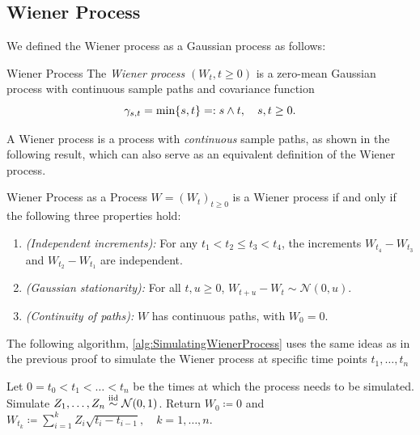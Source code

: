 \subsection{Wiener Process}

We defined the Wiener process as a Gaussian process as follows:
\begin{defn}{Wiener Process}{}
	The \textit{Wiener process} $(W_t, t \geq 0)$ is a zero-mean Gaussian process with continuous sample paths and covariance function
	\begin{equation}
		\gamma_{s,t} = \min\{s, t\} =: s \wedge t, \quad s, t \geq 0. \notag
		\label{eq:WienerProcessCovarianceFunction}
	\end{equation}
\end{defn}

A Wiener process is a \Levy \; process with \textit{continuous} sample paths, as shown in the following result, which can also serve as an equivalent definition of the Wiener process.

\begin{thm}{Wiener Process as a \Levy \; Process}{}
	$W = (W_t)_{t \geq 0}$ is a Wiener process if and only if the following three properties hold:
	\begin{enumerate}
		\item \textit{(Independent increments):} For any $t_1 < t_2 \leq t_3 < t_4$, the increments $W_{t_4} - W_{t_3}$ and $W_{t_2} - W_{t_1}$ are independent.
		\item \textit{(Gaussian stationarity):} For all $t, u \geq 0$, $W_{t+u} - W_t \sim \mathcal{N}(0, u)$.
		\item \textit{(Continuity of paths):} $W$ has continuous paths, with $W_0 = 0$.
	\end{enumerate}
\end{thm}

The following algorithm, \cref{alg:SimulatingWienerProcess} uses the same ideas as in the previous proof to simulate the Wiener process at specific time points $t_1,\dots,t_n$

\begin{algorithm}[H]
	\caption{Simulating a Wiener Process}
	\label{alg:SimulatingWienerProcess}
	\begin{algorithmic}[1]
		\State Let $0 = t_0 < t_1 < \dots < t_n$ be the times at which the process needs to be simulated.
		\State Simulate $Z_1, \dots, Z_n \stackrel{\mathrm{iid}}{\sim} \mathcal{N}(0, 1)$.
		\State Return $W_0 \coloneqq 0$ and $W_{t_k} \coloneqq \sum_{i=1}^k Z_i \sqrt{t_i - t_{i-1}}, \quad k = 1, \dots, n$.
	\end{algorithmic}
\end{algorithm}

